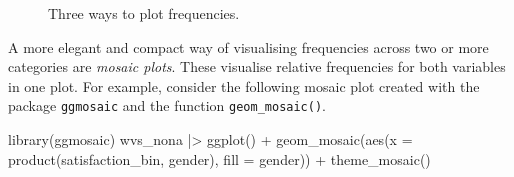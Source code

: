 \documentclass[
  letterpaper,
]{krantz}
\makeatletter
\newenvironment{Shaded}{\begin{snugshade}}{\end{snugshade}}
\newcommand{\AttributeTok}[1]{\textcolor[rgb]{0.40,0.45,0.13}{#1}}
\newcommand{\FunctionTok}[1]{\textcolor[rgb]{0.28,0.35,0.67}{#1}}
\newcommand{\NormalTok}[1]{\textcolor[rgb]{0.00,0.23,0.31}{#1}}
\newcommand{\SpecialCharTok}[1]{\textcolor[rgb]{0.37,0.37,0.37}{#1}}
\newenvironment{kframe}{%
\medskip{}
\setlength{\fboxsep}{.8em}
 \def\at@end@of@kframe{}%
 \ifinner\ifhmode%
  \def\at@end@of@kframe{\end{minipage}}%
  \begin{minipage}{\columnwidth}%
 \fi\fi%
 \def\FrameCommand##1{\hskip\@totalleftmargin \hskip-\fboxsep
 \colorbox{shadecolor}{##1}\hskip-\fboxsep
     \hskip-\linewidth \hskip-\@totalleftmargin \hskip\columnwidth}%
 \MakeFramed {\advance\hsize-\width
   \@totalleftmargin\z@ \linewidth\hsize
   \@setminipage}}%
 {\par\unskip\endMakeFramed%
 \at@end@of@kframe}
\renewenvironment{Shaded}{\begin{kframe}}{\end{kframe}}
\makeatother
\begin{document}
\begin{figure}[H]


\caption{\label{fig-three-plots-satisfaction-gender}Three ways to plot
frequencies.}

\end{figure}%

A more elegant and compact way of visualising frequencies across two or
more categories are \emph{mosaic plots}. These visualise relative
frequencies for both variables in one plot. For example, consider the
following mosaic plot created with the package \texttt{ggmosaic} and the
function \texttt{geom\_mosaic()}.

\begin{Shaded}
\begin{Highlighting}[]
\FunctionTok{library}\NormalTok{(ggmosaic)}
\NormalTok{wvs\_nona }\SpecialCharTok{|\textgreater{}}
  \FunctionTok{ggplot}\NormalTok{() }\SpecialCharTok{+}
  \FunctionTok{geom\_mosaic}\NormalTok{(}\FunctionTok{aes}\NormalTok{(}\AttributeTok{x =} \FunctionTok{product}\NormalTok{(satisfaction\_bin, gender),}
                            \AttributeTok{fill =}\NormalTok{ gender)) }\SpecialCharTok{+}
  \FunctionTok{theme\_mosaic}\NormalTok{()}
\end{Highlighting}
\end{Shaded}
\end{document}
